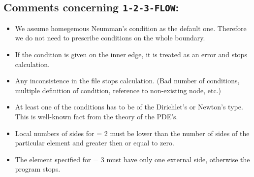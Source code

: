 \subsection*{Comments concerning {\tt 1-2-3-FLOW}:}
\begin{itemize}
  \item We assume homegemous Neumman's condition as the default one. Therefore
    we do not need to prescribe conditions on the whole boundary.
  \item If the condition is given on the inner edge, it is treated as an error
    and stops calculation.
  \item Any inconsistence in the file stops calculation. (Bad number of
    conditions, multiple definition of condition, reference to non-existing
    node, etc.)
  \item At least one of the conditions has to be of the Dirichlet's or
    Newton's type. This is well-known fact from the theory of the PDE's.
  \item Local numbers of sides for  = 2 must be lower than the 
    number of sides of the particular element and greater then or equal to zero.
  \item The element specified for  = 3 must have only one external
    side, otherwise the program stops.
\end{itemize}

